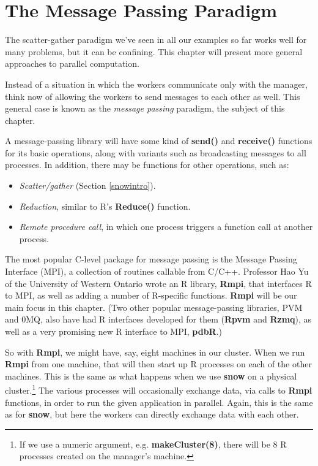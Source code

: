 \chapter{The Message Passing Paradigm} 
\label{chap:msgpass}


The scatter-gather paradigm we've seen in all our examples so far works
well for many problems, but it can be confining.  This chapter will
present more general approaches to parallel computation.

Instead of a situation in which the workers communicate only with the
manager, think now of allowing the workers to send messages to each
other as well.  This general case is known as the {\it message passing}
paradigm, the subject of this chapter.

A message-passing library will have some kind of {\bf send()} and {\bf
receive()} functions for its basic operations, along with variants such
as broadcasting messages to all processes.  In addition, there may be
functions for other operations, such as:

\begin{itemize}

\item {\it Scatter/gather} (Section \ref{snowintro}).

\item {\it Reduction}, similar to R's {\bf Reduce()} function. 

\item {\it Remote procedure call}, in which one process triggers a
function call at another process. 

\end{itemize}

The most popular C-level package for message passing is the Message
Passing Interface (MPI), a collection of routines callable from C/C++.
Professor Hao Yu of the University of Western Ontario wrote an R
library, {\bf Rmpi}, that interfaces R to MPI, as well as adding a
number of R-specific functions.  {\bf Rmpi} will be our main focus in
this chapter.  (Two other popular message-passing libraries, PVM and
0MQ, also have had R interfaces developed for them ({\bf Rpvm} and {\bf
Rzmq}), as well as a very
promising new R interface to MPI, {\bf pdbR}.)

So with {\bf Rmpi}, we might have, say, eight machines in our cluster.
When we run {\bf Rmpi} from one machine, that will then start up R
processes on each of the other machines.  This is the same as what
happens when we use {\bf snow} on a physical cluster.\footnote{If we use
a numeric argument, e.g. {\bf makeCluster(8)}, there will be 8 R
processes created on the manager's machine.} The various processes will
occasionally exchange data, via calls to {\bf Rmpi} functions, in order
to run the given application in parallel.  Again, this is the same as
for {\bf snow}, but here the workers can directly exchange data with
each other.

